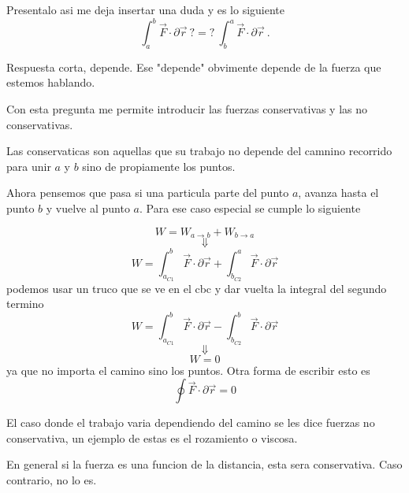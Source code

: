 \documentclass[../Main.tex]{subfiles}
\begin{document}
{    Presentalo asi me deja insertar una duda y es lo siguiente
    \begin{equation*}
        \int _a ^ b \vec{F} \cdot \partial \vec{r} \ ? = ? \ \int _b ^ a \vec{F} \cdot \partial \vec{r} \ .
    \end{equation*}

    Respuesta corta, depende. Ese "depende" obvimente depende de la fuerza que
    estemos hablando.

    Con esta pregunta me permite introducir las fuerzas conservativas y las no
    conservativas.

    Las conservaticas son aquellas que su trabajo no depende del camnino recorrido
    para unir $a$ y $b$ sino de propiamente los puntos.

}

{
Ahora pensemos que pasa si una particula parte del punto $a$, avanza hasta el
punto $b$ y vuelve al punto $a$. Para ese caso especial se cumple lo
siguiente

\begin{equation*}
    W = W_{a \rightarrow b} + W_{b \rightarrow a}
\end{equation*}
\begin{equation*}
    \Downarrow
\end{equation*}
\begin{equation*}
    W = \int _{a_{C1}} ^ b \vec{F} \cdot \partial \vec{r} + \int _{b_{C2}} ^ a \vec{F} \cdot \partial \vec{r}
\end{equation*}
podemos usar un truco que se ve en el cbc y dar vuelta la integral del segundo
termino
\begin{equation*}
    W = \int _{a_{C1}} ^ b \vec{F} \cdot \partial \vec{r} - \int _{b_{C2}} ^ b \vec{F} \cdot \partial \vec{r}
\end{equation*}
\begin{equation*}
    \Downarrow
\end{equation*}
\begin{equation*}
    W = 0
\end{equation*}
ya que no importa el camino sino los puntos. Otra forma de escribir esto es 
\begin{equation*}
    \oint \vec{F} \cdot \partial \vec{r} = 0
\end{equation*}

El caso donde el trabajo varia dependiendo del camino se les dice fuerzas no
conservativa, un ejemplo de estas es el rozamiento o viscosa.

En general si la fuerza es una funcion de la distancia, esta sera conservativa.
Caso contrario, no lo es.
}
\end{document}
